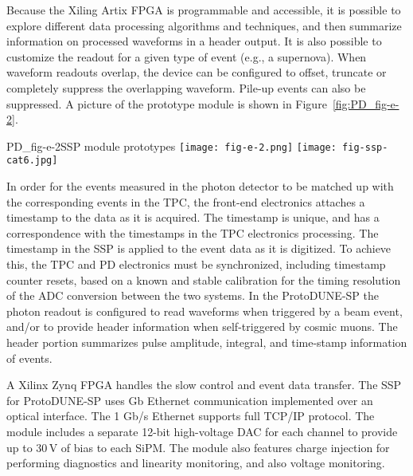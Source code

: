 Because  the Xiling Artix FPGA  is programmable  and accessible, it is possible to  explore  
different data processing algorithms  and  techniques,  and then  summarize
information  on  processed  waveforms  in %
a header output. 
It is also possible to customize the readout for a given type of event (e.g., a supernova).  
When waveform readouts overlap, the device can be configured to offset, 
truncate or completely suppress the overlapping waveform.  
Pile-up events can also be suppressed.  A picture of the prototype module is shown in Figure~\ref{fig:PD_fig-e-2}.  
%
\begin{cdrfigure}{PD_fig-e-2}{SSP module prototypes} 
\texttt{[image: fig-e-2.png]} \texttt{[image: fig-ssp-cat6.jpg]}
\end{cdrfigure}
%

In order for the events measured in the photon detector to be matched up 
with the corresponding events in the TPC, the front-end electronics 
attaches a timestamp to the data as it is acquired.  
The timestamp is unique, and has a correspondence with the timestamps in 
the TPC electronics processing.  
The timestamp in the SSP is applied to the event data as it is digitized. 
To achieve this, the TPC and PD electronics must be synchronized, 
including timestamp counter resets, based on a known and stable calibration 
for the timing resolution of the ADC conversion between the two systems.  
In the ProtoDUNE-SP the photon readout is configured to read waveforms when triggered by a beam event,
and/or to provide header information when self-triggered by cosmic muons.
The header portion summarizes pulse amplitude, integral, and time-stamp information of events.

A Xilinx Zynq FPGA handles the slow control and event data transfer.  
The SSP for ProtoDUNE-SP uses Gb Ethernet communication implemented over an optical interface.
The 1 Gb/s Ethernet supports full TCP/IP protocol.  
The module includes a separate 12-bit high-voltage DAC for each channel to 
provide up to 30\,V of bias to each SiPM.  
The module also features charge injection for performing diagnostics and linearity 
monitoring, and also voltage monitoring.

